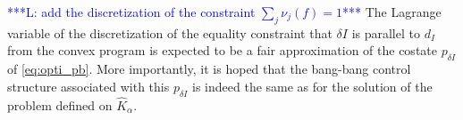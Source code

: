 \documentclass[AMA,STIX1COL]{WileyNJD-v2}
\newcommand{\bluetext}{\textcolor{blue}}
\newcommand{\com}[1]{\bluetext{***#1***}}
\begin{document}
%
\com{L: add the discretization of the constraint $\sum_j \nu_j(f)=1$}
%
The Lagrange variable of the discretization of the equality constraint that $\delta I$ is parallel to $d_I$
from the convex program is expected to
be a fair approximation of the costate $p_{\delta I}$ of \eqref{eq:opti_pb}.
More importantly, it is hoped that
the bang-bang control structure associated with this $p_{\delta I}$ is indeed the same as for the solution
of the problem defined on $\hat{K}_\alpha$.

\end{document}
